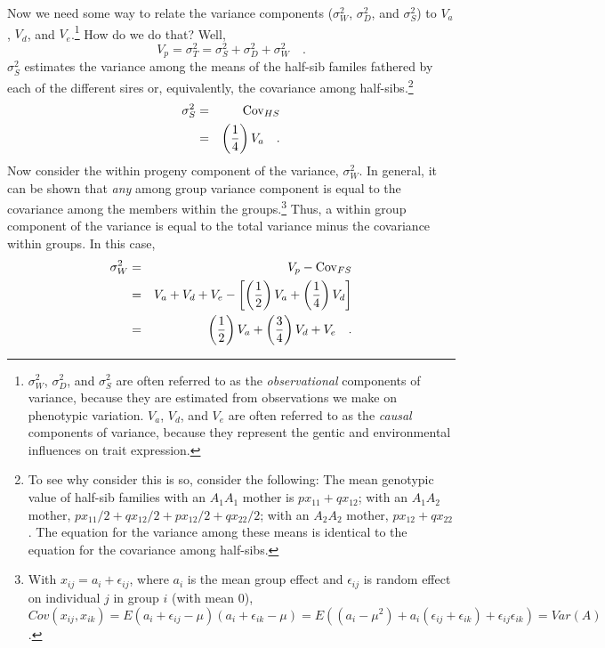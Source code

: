 Now we need some way to relate the variance components ($\sigma^2_W$,
$\sigma^2_D$, and $\sigma^2_S$) to $V_a$, $V_d$, and
$V_e$.\footnote{$\sigma^2_W$, $\sigma^2_D$, and $\sigma^2_S$ are often
  referred to as the {\it observational\/} components of variance,
  because they are estimated from observations we make on phenotypic
  variation. $V_a$, $V_d$, and $V_e$ are often referred to as the {\it
    causal\/} components of variance, because they represent the
  gentic and environmental influences on trait
  expression.} How do we
do that?  Well,
\[
V_p = \sigma^2_T = \sigma^2_S + \sigma^2_D + \sigma^2_W \quad .
\]
$\sigma^2_S$ estimates the variance among the means of the half-sib
familes fathered by each of the different sires or, equivalently, the
covariance among half-sibs.\footnote{To see why consider this is so,
  consider the following: The mean genotypic value of half-sib
  families with an $A_1A_1$ mother is $px_{11} + qx_{12}$; with an
  $A_1A_2$ mother, $px_{11}/2 + qx_{12}/2 + px_{12}/2 + qx_{22}/2$;
  with an $A_2A_2$ mother, $px_{12} + qx_{22}$.  The equation for the
  variance among these means is identical to the equation for the
  covariance among half-sibs.}
\begin{eqnarray*}
\sigma^2_S &=& \mbox{Cov}_{HS} \\
           &=& \left(\frac{1}{4}\right)V_a \quad .
\end{eqnarray*}
Now consider the within progeny component of the variance,
$\sigma^2_W$.  In general, it can be shown that {\it any\/} among
group variance component is equal to the covariance among the members
within the groups.\footnote{With $x_{ij} = a_i + \epsilon_{ij}$, where
  $a_i$ is the mean group effect and $\epsilon_{ij}$ is random effect
  on individual $j$ in group $i$ (with mean 0), $Cov(x_{ij},x_{ik}) =
  E(a_i + \epsilon_{ij} - \mu)(a_i + \epsilon_{ik} - \mu) = E((a_i
  -\mu^2) + a_i(\epsilon_{ij} + \epsilon_{ik}) +
  \epsilon_{ij}\epsilon_{ik}) = Var(A)$.}  Thus, a within group
component of the variance is equal to the total variance minus the
covariance within groups.  In this case,
\begin{eqnarray*}
\sigma^2_W &=& V_p - \mbox{Cov}_{FS} \\
 &=& V_a + V_d + V_e - \left[\left(\frac{1}{2}\right)V_a +
                            \left(\frac{1}{4}\right)V_d
                      \right] \\
 &=& \left(\frac{1}{2}\right)V_a
    + \left({3 \over 4}\right)V_d
    + V_e \quad .
\end{eqnarray*}
